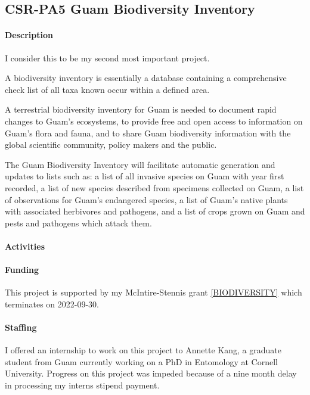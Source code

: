 \subsection{CSR-PA5 Guam Biodiversity Inventory}
\begin{refsection}
	
	\paragraph{Description}
	
	I consider this to be my second most important project.
	
	A biodiversity inventory is essentially a database containing a comprehensive
	check list of all taxa known occur within a defined area.
	
	A terrestrial biodiversity inventory for Guam is needed to document
	rapid changes to Guam's ecosystems, to provide free
	and open access to information on Guam's flora and
	fauna, and to share Guam biodiversity information with the global
	scientific community, policy makers and the public.
	
	The Guam Biodiversity Inventory will facilitate automatic generation
	and updates to lists such as: a list of all invasive species on Guam
	with year first recorded, a list of new species described from specimens
	collected on Guam, a list of observations for Guam's
	endangered species, a list of Guam's native plants
	with associated herbivores and pathogens, and a list of crops grown
	on Guam and pests and pathogens which attack them.
	
	\paragraph{Activities}
	
	\paragraph{Funding} This project is supported by my McIntire-Stennis grant \ref{BIODIVERSITY} which terminates on 2022-09-30.
	
	\paragraph{Staffing} I offered an internship to work on this project to Annette Kang, a graduate student from Guam currently working on a PhD in Entomology at Cornell University. Progress on this project was impeded because of a nine month delay in processing my interns stipend payment.  	
	

\end{refsection}
